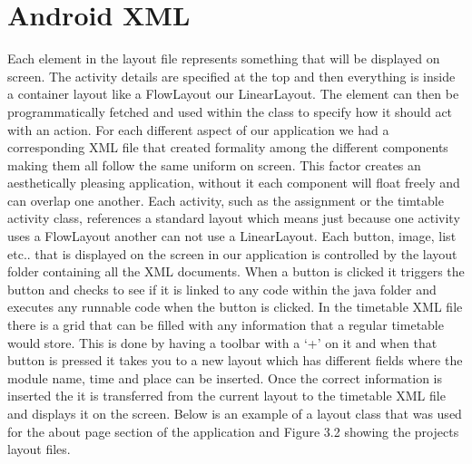 \pagebreak
\section{Android XML}
Each element in the layout file represents something that will be displayed on screen. The activity details are specified at the top and then everything is inside a container layout like a FlowLayout our LinearLayout. The element can then be programmatically fetched and used within the class to specify how it should act with an action. For each different aspect of our application we had a corresponding XML file that created formality among the different components making them all follow the same uniform on screen. This factor creates an aesthetically pleasing application, without it each component will float freely and can overlap one another. Each activity, such as the assignment or the timtable activity class, references a standard layout which means just because one activity uses a FlowLayout another can not use a LinearLayout. Each button, image, list etc.. that is displayed on the screen in our application is controlled by the layout folder containing all the XML documents. When a button is clicked it triggers the button and checks to see if it is linked to any code within the java folder and executes any runnable code when the button is clicked. In the timetable XML file there is a grid that can be filled with any information that a regular timetable would store. This is done by having a toolbar with a ‘+’ on it and when that button is pressed it takes you to a new layout which has different fields where the module name, time and place can be inserted. Once the correct information is inserted the it is transferred from the current layout to the timetable XML file and displays it on the screen. Below is an example of a layout class that was used for the about page section of the application and Figure 3.2 showing the projects layout files.
 
